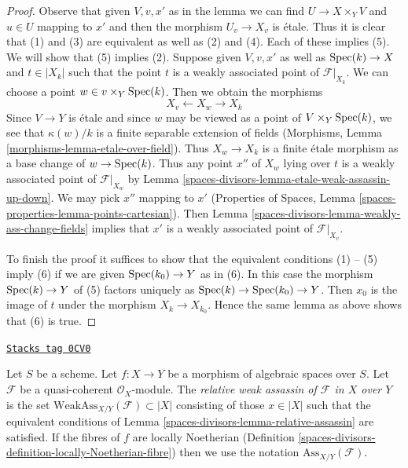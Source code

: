 \begin{proof}
Observe that given $V, v, x'$ as in the lemma we can find
$U \to X \times_Y V$ and $u \in U$ mapping to $x'$
and then the morphism $U_v \to X_v$ is \'etale.
Thus it is clear that (1) and (3) are equivalent
as well as (2) and (4). Each of these implies (5).
We will show that (5) implies (2).
Suppose given $V, v, x'$ as well as $\operatorname{Spec}(k) \to X$ and $t \in |X_k|$
such that the point $t$ is a weakly
associated point of $\mathcal{F}|_{X_k}$.
We can choose a point $w \in v \times_Y \operatorname{Spec}(k)$.
Then we obtain the morphisms
$$
X_v \longleftarrow X_w \longrightarrow X_k
$$
Since $V \to Y$ is \'etale and since $w$ may be viewed as a point of
$V \times_Y \operatorname{Spec}(k)$, we see that $\kappa(w)/k$
is a finite separable extension of fields
(Morphisms, Lemma \ref{morphisms-lemma-etale-over-field}).
Thus $X_w \to X_k$ is a finite \'etale morphism as a base change of
$w \to \operatorname{Spec}(k)$. Thus any point $x''$ of $X_w$ lying over $t$
is a weakly associated point of $\mathcal{F}|_{X_w}$ by
Lemma \ref{spaces-divisors-lemma-etale-weak-assassin-up-down}.
We may pick $x''$ mapping to $x'$
(Properties of Spaces, Lemma \ref{spaces-properties-lemma-points-cartesian}).
Then Lemma \ref{spaces-divisors-lemma-weakly-ass-change-fields}
implies that $x'$ is a weakly associated
point of $\mathcal{F}|_{X_v}$.

\medskip\noindent
To finish the proof it suffices to show that the equivalent
conditions (1) -- (5) imply (6) if we are given
$\operatorname{Spec}(k_0) \to Y$ as in (6). In this case the morphism
$\operatorname{Spec}(k) \to Y$ of (5) factors uniquely as $\operatorname{Spec}(k) \to \operatorname{Spec}(k_0) \to Y$.
Then $x_0$ is the image of $t$ under the morphism $X_k \to X_{k_0}$.
Hence the same lemma as above shows that (6) is true.
\end{proof}

\begin{definition}
\label{spaces-divisors-definition-relative-weak-assassin}
\href{https://stacks.math.columbia.edu/tag/0CV0}{\texttt{Stacks tag 0CV0}}

Let $S$ be a scheme. Let $f : X \to Y$ be a morphism of algebraic spaces
over $S$. Let $\mathcal{F}$ be a quasi-coherent $\mathcal{O}_X$-module.
The {\it relative weak assassin of $\mathcal{F}$ in $X$ over $Y$}
is the set $\text{WeakAss}_{X/Y}(\mathcal{F}) \subset |X|$
consisting of those $x \in |X|$ such that the equivalent conditions of
Lemma \ref{spaces-divisors-lemma-relative-assassin} are satisfied.
If the fibres of $f$ are locally Noetherian
(Definition \ref{spaces-divisors-definition-locally-Noetherian-fibre})
then we use the notation $\text{Ass}_{X/Y}(\mathcal{F})$.
\end{definition}

